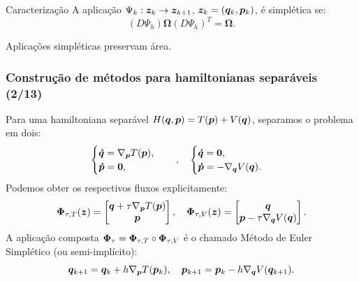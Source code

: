 \begin{frame}
\pause

\begin{block}{Caracterização}
    A aplicação $\Psi_k: \bm z_k \to \bm z_{k+1}$, $\bm z_k = (\bm q_k, \bm p_k)$, é simplética se:
    \begin{equation}
        (D \Psi_h) \bm \Omega (D \Psi_h)^T = \bm \Omega.
    \end{equation}
\end{block}

\begin{exampleblock}{}
    Aplicações simpléticas preservam área.
\end{exampleblock}

\end{frame}


\begin{frame}
\justifying
\frametitle{Construção de métodos para hamiltonianas separáveis (2/13)}

Para uma hamiltoniana separável $H(\bm q, \bm p) = T(\bm p) + V(\bm q)$, separamos o problema em dois:
$$
\begin{cases}
    \bm {\dot q} = \nabla_{\bm p} T(\bm p), \\
    \bm {\dot p} = \bm 0,
\end{cases}
\quad , \quad
\begin{cases}
    \bm {\dot q} = \bm 0, \\
    \bm {\dot p} = - \nabla_{\bm q} V(\bm q).
\end{cases}
$$
\pause
Podemos obter os respectivos fluxos explicitamente:
$$
\bm \Phi_{\tau, T}(\bm z) = \begin{bmatrix}
\bm q + \tau \nabla_{\bm p} T(\bm p) \\
\bm p
\end{bmatrix},
\quad
\bm \Phi_{\tau, V}(\bm z) = \begin{bmatrix}
\bm q \\
\bm p - \tau \nabla_{\bm q} V(\bm q)
\end{bmatrix}.
$$
\pause
A aplicação composta $\bm \Phi_\tau = \bm \Phi_{\tau, T} \circ \bm \Phi_{\tau, V}$ é o chamado Método de Euler Simplético (ou semi-implícito):
$$
\bm q_{k+1} = \bm q_k + h \nabla_{\bm p} T(\bm p_k),
\quad
\bm p_{k+1} = \bm p_k - h \nabla_{\bm q} V(\bm q_{k+1}).
$$

\end{frame}



